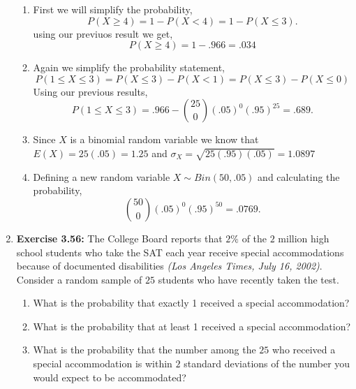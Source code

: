 \documentclass[12pt]{article}
\theoremstyle{homework}
\begin{document}
\begin{enumerate}
\begin{enumerate}
\item First we will simplify the probability,
\begin{equation*}
  P(X \geq 4) = 1 - P(X < 4) = 1 - P(X \le 3).
\end{equation*}
using our previuos result we get,
\begin{equation*}
  P(X \geq 4) = 1 - .966 = .034
\end{equation*}

\item Again we simplify the probability statement, 
\begin{equation*}
  P(1\le X \le 3) = P(X \le 3) - P(X < 1) = P(X \le 3) - P(X \le 0) 
\end{equation*}
Using our previous results,
\begin{equation*}
  P(1\le X \le 3) = .966 -  \binom{25}{0}(.05)^0(.95)^25 = .689.
\end{equation*}
\item Since $X$ is a binomial random variable we know that $E(X) = 25(.05) = 1.25$ and $\sigma_X = \sqrt{25(.95)(.05)} = 1.0897$
\item Defining a new random variable $X\sim Bin(50, .05)$ and calculating the probability, 
\begin{equation*}
  \binom{50}{0}(.05)^0(.95)^50 = .0769.
\end{equation*}
\end{enumerate}
\vspace{.5in}







\item\hspace{.5in}\textbf{Exercise 3.56:} The College Board reports that $2\%$ of the $2$ million high school students who take the SAT each year receive special accommodations because of documented disabilities \emph{(Los Angeles Times, July 16, 2002)}. Consider a random sample of $25$ students who have recently taken the test.
\begin{enumerate}
\item What is the probability that exactly 1 received a special accommodation?
\item What is the probability that at least 1 received a special accommodation?
\addtocounter{enumii}{1}
\item What is the probability that the number among the $25$ who received a special accommodation is within $2$ standard deviations of the number you would expect to be accommodated?
\end{enumerate}


\end{enumerate}
\end{document}
